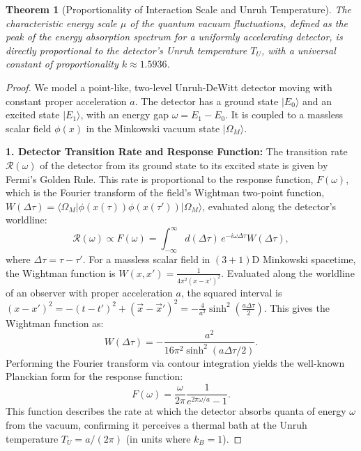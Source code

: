 \documentclass[11pt, letterpaper]{report}
\theoremstyle{plain} %
\newtheorem{theorem}{Theorem}[chapter]
\theoremstyle{definition} %
\theoremstyle{remark} %
\begin{document}
\begin{theorem}[Proportionality of Interaction Scale and Unruh Temperature]
\label{thm:mu_T_proportionality_rigorous}
The characteristic energy scale $\mu$ of the quantum vacuum fluctuations, defined as the peak of the energy absorption spectrum for a uniformly accelerating detector, is directly proportional to the detector's Unruh temperature $T_U$, with a universal constant of proportionality $k \approx 1.5936$.
\end{theorem}
\begin{proof}
We model a point-like, two-level Unruh-DeWitt detector moving with constant proper acceleration $a$. The detector has a ground state $|E_0\rangle$ and an excited state $|E_1\rangle$, with an energy gap $\omega = E_1 - E_0$. It is coupled to a massless scalar field $\phi(x)$ in the Minkowski vacuum state $|\Omega_M\rangle$.

\textbf{1. Detector Transition Rate and Response Function:}
The transition rate $\mathcal{R}(\omega)$ of the detector from its ground state to its excited state is given by Fermi's Golden Rule. This rate is proportional to the response function, $F(\omega)$, which is the Fourier transform of the field's Wightman two-point function, $W(\Delta\tau) = \langle \Omega_M | \phi(x(\tau)) \phi(x(\tau')) | \Omega_M \rangle$, evaluated along the detector's worldline:
\begin{equation}
    \mathcal{R}(\omega) \propto F(\omega) = \int_{-\infty}^{\infty} d(\Delta\tau) \, e^{-i\omega\Delta\tau} W(\Delta\tau),
\end{equation}
where $\Delta\tau = \tau - \tau'$. For a massless scalar field in $(3+1)$D Minkowski spacetime, the Wightman function is $W(x,x') = \frac{1}{4\pi^2(x-x')^2}$. Evaluated along the worldline of an observer with proper acceleration $a$, the squared interval is $(x-x')^2 = -(t-t')^2 + (\vec{x}-\vec{x}')^2 = -\frac{4}{a^2} \sinh^2(\frac{a\Delta\tau}{2})$. This gives the Wightman function as:
\begin{equation}
    W(\Delta\tau) = -\frac{a^2}{16\pi^2 \sinh^2(a\Delta\tau/2)}.
\end{equation}
Performing the Fourier transform via contour integration yields the well-known Planckian form for the response function:
\begin{equation}
    F(\omega) = \frac{\omega}{2\pi} \frac{1}{e^{2\pi\omega/a} - 1}.
\end{equation}
This function describes the rate at which the detector absorbs quanta of energy $\omega$ from the vacuum, confirming it perceives a thermal bath at the Unruh temperature $T_U = a/(2\pi)$ (in units where $k_B = 1$).


\end{proof}
\end{document}
